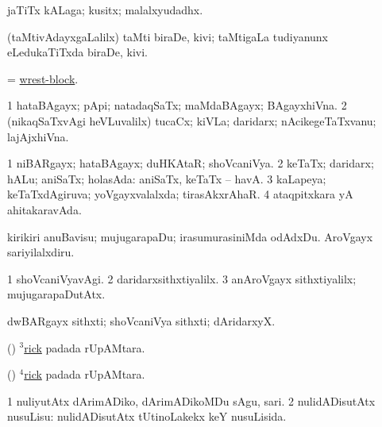 \bentry
{} 
\gl{\nA}
\expl{}
\bmng
jaTiTx kALaga; kusitx; malalxyudadhx. 
\emng
\eentry

\bentry
{} 
\gl{\nA}
\expl{}
\bmng
(taMtivAdayxgaLalilx) taMti biraDe, kivi; taMtigaLa tudiyanunx eLedukaTiTxda biraDe, kivi. 
\emng
\eentry

\bentry
{} 
\gl{\nA}
\expl{}
\bmng
= \hyperlink{wrest-block}{wrest-block}. 
\emng
\eentry

\bentry
{} 
\gl{\nA}
\expl{}
\bmng
\bnum
\num{1} hataBAgayx; pApi; natadaqSaTx; maMdaBAgayx; BAgayxhiVna. 
\num{2} (nikaqSaTxvAgi heVLuvalilx) tucaCx; kiVLa; daridarx; nAcikegeTaTxvanu; lajAjxhiVna. 
\enum
\emng
\eentry

\bentry
{} 
\gl{\gu}
\bmng
\bnum
\num{1} niBARgayx; hataBAgayx; duHKAtaR; shoVcaniVya. 
\num{2} keTaTx; daridarx; hALu; aniSaTx; holasAda:  aniSaTx, keTaTx -- havA. 
\num{3} kaLapeya; keTaTxdAgiruva; yoVgayxvalalxda; tirasAkxrAhaR. 
\num{4} ataqpitxkara yA ahitakaravAda. 
\enum
\emng

\noindent
\gl{\pagu}
\expl{}
\bmng
{} 
\banum
{} kirikiri anuBavisu; mujugarapaDu; irasumurasiniMda odAdxDu. 
 AroVgayx sariyilalxdiru. 
\eanum
\emng
\eentry

\bentry
{} 
\gl{\kirxvi}
\expl{}
\bmng
\bnum
\num{1} shoVcaniVyavAgi. 
\num{2} daridarxsithxtiyalilx. 
\num{3} anAroVgayx sithxtiyalilx; mujugarapaDutAtx. 
\enum
\emng
\eentry

\bentry
{} 
\gl{\nA}
\expl{}
\bmng
dwBARgayx sithxti; shoVcaniVya sithxti; dAridarxyX. 
\emng
\eentry

\bentry
{} 
\gl{\nA}
\bmng
(\birx) \hyperref{kandict_r.pdf}{R}{rick(3)}{$^3$rick} padada rUpAMtara. 
\emng
\eentry

\bentry
{} 
\gl{\sakirx}
\expl{}
\bmng
(\birx) \hyperref{kandict_r.pdf}{R}{rick(4)}{$^4$rick} padada rUpAMtara. 
\emng
\eentry

\bentry
{} 
\gl{\sakirx}
\expl{}
\bmng
\bnum
\num{1} nuliyutAtx dArimADiko, dArimADikoMDu sAgu, sari. 
\num{2} nulidADisutAtx nusuLisu:  nulidADisutAtx tUtinoLakekx keY nusuLisida. 
\enum
\emng

